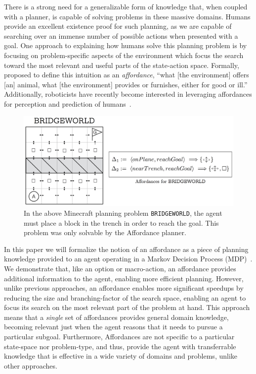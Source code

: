 \documentclass[]{article}
\begin{document}
There is a strong need for a generalizable form of knowledge that,
when coupled with a planner, is capable of solving problems in these
massive domains. Humans provide an excellent existence proof for such
planning, as we are capable of searching over an immense number of
possible actions when presented with a goal.  One approach to
explaining how humans solve this planning problem is by focusing on
problem-specific aspects of the environment which focus the search
toward the most relevant and useful parts of the state-action space.
Formally, \citet{gibson77} proposed to define this intuition as an
{\em affordance}, ``what [the environment] offers [an] animal, what
[the environment] provides or furnishes, either for good or ill.''
Additionally, roboticists have recently become interested in
leveraging affordances for perception and prediction of
humans~\citep{koppula13a, koppula13b}.

\begin{figure}
\centering
\includegraphics[scale = 0.18]{figures/bridgeworld_aff.png}
\caption{In the above Minecraft planning problem \texttt{BRIDGEWORLD}, the agent must place a block in the trench in order to reach the goal. This problem was only solvable by the Affordance planner.\label{fig:bridgeworld_aff}}
\end{figure}

In this paper we will formalize
the notion of an affordance as a piece of planning knowledge provided
to an agent operating in a Markov Decision Process
(MDP)~\citep{kaelbling99}.  We demonstrate that, like an option or
macro-action, an affordance provides additional information to the
agent, enabling more efficient planning.  However, unlike previous
approaches, an affordance enables more significant speedups by
reducing the size and branching-factor of the search space, enabling
an agent to focus its search on the most relevant part of the problem
at hand.  This approach means that a {\em single} set of affordances
provides general domain knowledge, becoming relevant just when the
agent reasons that it needs to pursue a particular subgoal.  Furthermore,
Affordances are not specific to a particular state-space nor problem-type, and thus, provide
the agent with transferrable knowledge that is effective in a wide variety of
domains and problems, unlike other approaches.
\end{document}

